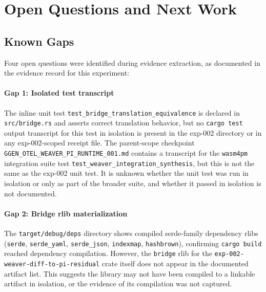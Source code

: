 
\section{Open Questions and Next Work}
\label{sec:otel-weaver-exp-002-diff-to-residual-open}

\subsection{Known Gaps}
\label{sec:otel-weaver-exp-002-diff-to-residual-open-gaps}

Four open questions were identified during evidence extraction, as documented in the
evidence record for this experiment:

\paragraph{Gap 1: Isolated test transcript}
The inline unit test \texttt{test\_bridge\_translation\_equivalence} is declared in
\texttt{src/bridge.rs} and asserts correct translation behavior, but no
\texttt{cargo test} output transcript for this test in isolation is present in the
exp-002 directory or in any exp-002-scoped receipt file. The parent-scope checkpoint
\texttt{GGEN\_OTEL\_WEAVER\_PI\_RUNTIME\_001.md} contains a transcript for the
\texttt{wasm4pm} integration suite test \texttt{test\_weaver\_integration\_synthesis},
but this is not the same as the exp-002 unit test. It is unknown whether the unit
test was run in isolation or only as part of the broader suite, and whether it passed
in isolation is not documented.

\paragraph{Gap 2: Bridge rlib materialization}
The \texttt{target/debug/deps} directory shows compiled serde-family dependency
rlibs (\texttt{serde}, \texttt{serde\_yaml}, \texttt{serde\_json}, \texttt{indexmap},
\texttt{hashbrown}), confirming \texttt{cargo build} reached dependency compilation.
However, the \texttt{bridge} rlib for the \texttt{exp-002-weaver-diff-to-pi-residual}
crate itself does not appear in the documented artifact list. This suggests the
library may not have been compiled to a linkable artifact in isolation, or the
evidence of its compilation was not captured.

